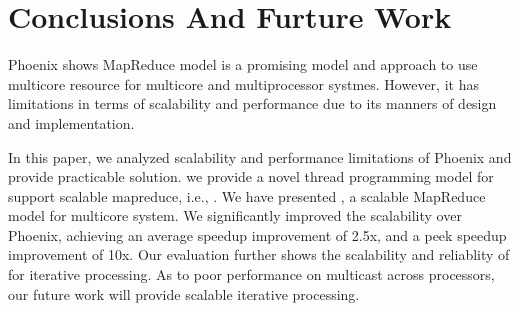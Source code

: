 \section{Conclusions And Furture Work}
\label{sec:concl}
Phoenix shows MapReduce model is a promising model and approach to use multicore resource for multicore and multiprocessor systmes.
However, it has limitations in terms of scalability and performance due to its manners of design and implementation.

In this paper, we analyzed scalability and performance limitations of Phoenix and provide practicable solution.
we provide a novel thread programming model for support scalable mapreduce, i.e., \myds. 
We have presented \myds, a scalable MapReduce model for multicore system.
We significantly improved the scalability over Phoenix, achieving an average speedup improvement of 2.5x, and a peek speedup improvement of 10x.
Our evaluation further shows the scalability and reliablity of \myds for iterative processing.
As to poor performance on multicast across processors, our future work will provide scalable iterative processing.
